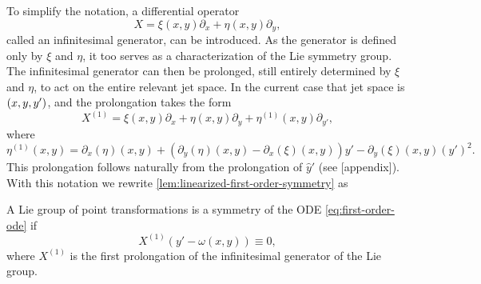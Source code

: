 To simplify the notation, a differential operator
\begin{equation}
  X = \xi(x,y) \partial_x + \eta(x,y) \partial_y,
\end{equation}
called an infinitesimal generator, can be introduced.
As the generator is defined only by \(\xi\) and \(\eta\), it too serves as a characterization of the Lie symmetry group.
The infinitesimal generator can then be prolonged, still entirely determined by \(\xi\) and \(\eta\), to act on the entire relevant jet space.
In the current case that jet space is \(\pqty{x, y, y'}\), and the prolongation takes the form
\begin{equation}
  X^{(1)} = \xi(x,y) \partial_x + \eta(x,y) \partial_y + \eta^{(1)}(x,y) \partial_{y'},
\end{equation}
where
\begin{equation}
  \eta^{(1)}(x,y) =
  \partial_x(\eta)(x,y) + (\partial_y(\eta)(x,y) - \partial_x(\xi)(x,y)) y' - \partial_y(\xi)(x,y) \left(y'\right)^2.
\end{equation}
This prolongation follows naturally from the prolongation of \(\hat{y}'\) (see [appendix]). %
With this notation we rewrite \cref{lem:linearized-first-order-symmetry} as
\begin{thm} \label{thm:linearized-first-order-symmetry}
  A Lie group of point transformations is a symmetry of the ODE \ref{eq:first-order-ode} if
  \begin{equation} \label{eq:linearized-first-order-symmetry}
    X^{(1)}\left(y' - \omega(x,y)\right) \equiv 0,
  \end{equation}
  where \(X^{(1)}\) is the first prolongation of the infinitesimal generator of the Lie group.
\end{thm} %
